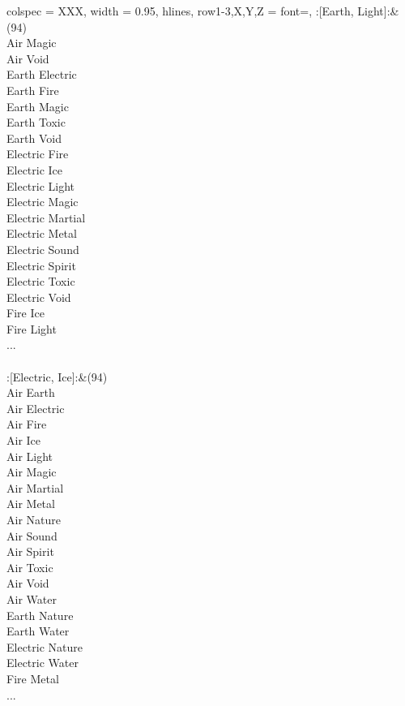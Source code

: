 \begin{longtblr}[
	caption = {2v2 Defending Weak},
	label = {2v2-Defending-Weak},
]{
	colspec = {XXX}, width = 0.95\linewidth,
	hlines,
	row{1-3,X,Y,Z} = {font=\bfseries},
}
	:[Earth, Light]:&{(94)\\
	Air Magic \\
	Air Void \\
	Earth Electric \\
	Earth Fire \\
	Earth Magic \\
	Earth Toxic \\
	Earth Void \\
	Electric Fire \\
	Electric Ice \\
	Electric Light \\
	Electric Magic \\
	Electric Martial \\
	Electric Metal \\
	Electric Sound \\
	Electric Spirit \\
	Electric Toxic \\
	Electric Void \\
	Fire Ice \\
	Fire Light \\
	...\\
	}\\

	:[Electric, Ice]:&{(94)\\
	Air Earth \\
	Air Electric \\
	Air Fire \\
	Air Ice \\
	Air Light \\
	Air Magic \\
	Air Martial \\
	Air Metal \\
	Air Nature \\
	Air Sound \\
	Air Spirit \\
	Air Toxic \\
	Air Void \\
	Air Water \\
	Earth Nature \\
	Earth Water \\
	Electric Nature \\
	Electric Water \\
	Fire Metal \\
	...\\
	}\\


\end{longtblr}
